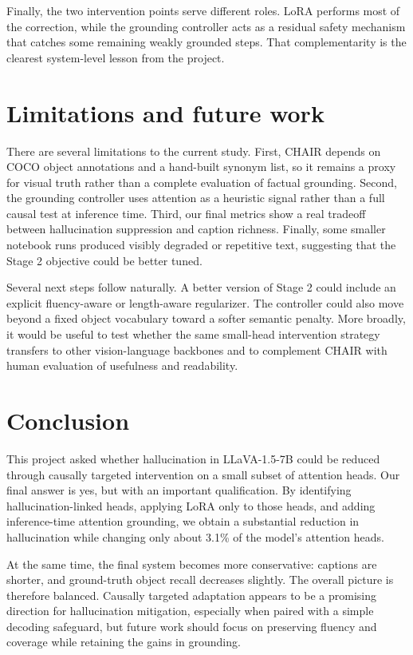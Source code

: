 \documentclass[10pt,twocolumn]{article}
\begin{document}
Finally, the two intervention points serve different roles. LoRA performs most of the correction, while the grounding controller acts as a residual safety mechanism that catches some remaining weakly grounded steps. That complementarity is the clearest system-level lesson from the project.

\section{Limitations and future work}
There are several limitations to the current study. First, CHAIR depends on COCO object annotations and a hand-built synonym list, so it remains a proxy for visual truth rather than a complete evaluation of factual grounding. Second, the grounding controller uses attention as a heuristic signal rather than a full causal test at inference time. Third, our final metrics show a real tradeoff between hallucination suppression and caption richness. Finally, some smaller notebook runs produced visibly degraded or repetitive text, suggesting that the Stage 2 objective could be better tuned.

Several next steps follow naturally. A better version of Stage 2 could include an explicit fluency-aware or length-aware regularizer. The controller could also move beyond a fixed object vocabulary toward a softer semantic penalty. More broadly, it would be useful to test whether the same small-head intervention strategy transfers to other vision-language backbones and to complement CHAIR with human evaluation of usefulness and readability.

\section{Conclusion}
This project asked whether hallucination in LLaVA-1.5-7B could be reduced through causally targeted intervention on a small subset of attention heads. Our final answer is yes, but with an important qualification. By identifying hallucination-linked heads, applying LoRA only to those heads, and adding inference-time attention grounding, we obtain a substantial reduction in hallucination while changing only about 3.1\% of the model's attention heads.

At the same time, the final system becomes more conservative: captions are shorter, and ground-truth object recall decreases slightly. The overall picture is therefore balanced. Causally targeted adaptation appears to be a promising direction for hallucination mitigation, especially when paired with a simple decoding safeguard, but future work should focus on preserving fluency and coverage while retaining the gains in grounding.



\end{document}
